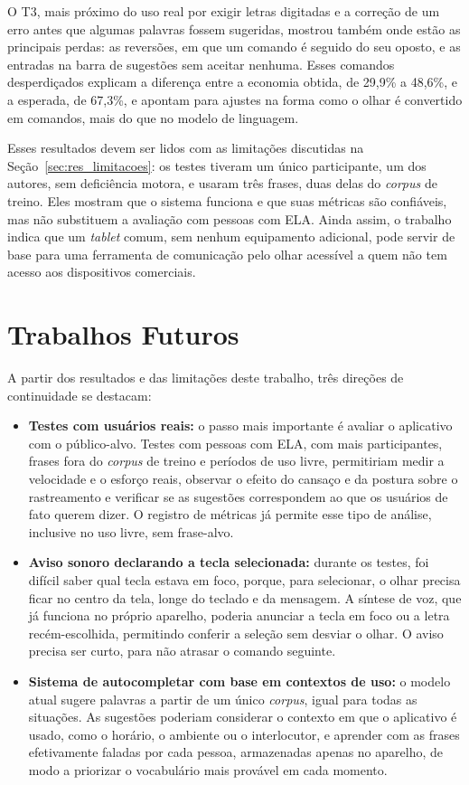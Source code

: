 O T3, mais próximo do uso real por exigir letras digitadas e a correção de um erro antes que algumas palavras fossem sugeridas, mostrou também onde estão as principais perdas: as reversões, em que um comando é seguido do seu oposto, e as entradas na barra de sugestões sem aceitar nenhuma. Esses comandos desperdiçados explicam a diferença entre a economia obtida, de 29,9\% a 48,6\%, e a esperada, de 67,3\%, e apontam para ajustes na forma como o olhar é convertido em comandos, mais do que no modelo de linguagem.

Esses resultados devem ser lidos com as limitações discutidas na Seção~\ref{sec:res_limitacoes}: os testes tiveram um único participante, um dos autores, sem deficiência motora, e usaram três frases, duas delas do \textit{corpus} de treino. Eles mostram que o sistema funciona e que suas métricas são confiáveis, mas não substituem a avaliação com pessoas com \gls{ELA}. Ainda assim, o trabalho indica que um \textit{tablet} comum, sem nenhum equipamento adicional, pode servir de base para uma ferramenta de comunicação pelo olhar acessível a quem não tem acesso aos dispositivos comerciais.

\section{Trabalhos Futuros}

A partir dos resultados e das limitações deste trabalho, três direções de continuidade se destacam:

\begin{itemize}
    \item \textbf{Testes com usuários reais:} o passo mais importante é avaliar o aplicativo com o público-alvo. Testes com pessoas com \gls{ELA}, com mais participantes, frases fora do \textit{corpus} de treino e períodos de uso livre, permitiriam medir a velocidade e o esforço reais, observar o efeito do cansaço e da postura sobre o rastreamento e verificar se as sugestões correspondem ao que os usuários de fato querem dizer. O registro de métricas já permite esse tipo de análise, inclusive no uso livre, sem frase-alvo.
    \item \textbf{Aviso sonoro declarando a tecla selecionada:} durante os testes, foi difícil saber qual tecla estava em foco, porque, para selecionar, o olhar precisa ficar no centro da tela, longe do teclado e da mensagem. A síntese de voz, que já funciona no próprio aparelho, poderia anunciar a tecla em foco ou a letra recém-escolhida, permitindo conferir a seleção sem desviar o olhar. O aviso precisa ser curto, para não atrasar o comando seguinte.
    \item \textbf{Sistema de autocompletar com base em contextos de uso:} o modelo atual sugere palavras a partir de um único \textit{corpus}, igual para todas as situações. As sugestões poderiam considerar o contexto em que o aplicativo é usado, como o horário, o ambiente ou o interlocutor, e aprender com as frases efetivamente faladas por cada pessoa, armazenadas apenas no aparelho, de modo a priorizar o vocabulário mais provável em cada momento.
\end{itemize}
